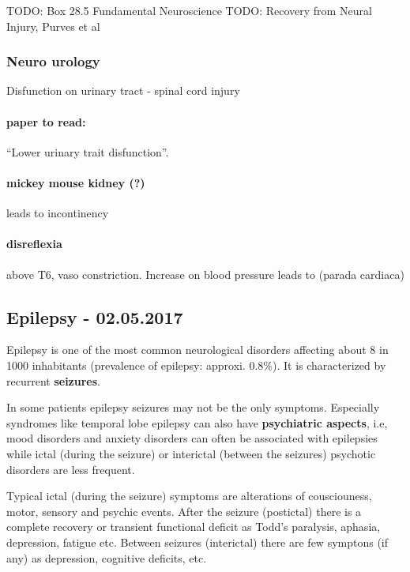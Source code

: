 \documentclass[12pt,article,oneside,a4paper]{memoir}
\begin{document}
TODO: Box 28.5 Fundamental Neuroscience
TODO: Recovery from Neural Injury, Purves et al
\subsubsection{Neuro urology}
Disfunction on urinary tract - spinal cord injury
\paragraph{paper to read:} ``Lower urinary trait disfunction''.

\paragraph{mickey mouse kidney (?)} leads to incontinency

\paragraph{disreflexia}  above T6, vaso constriction. Increase on blood pressure leads to (parada cardiaca)

\newpage
\subsection{Epilepsy - 02.05.2017}
Epilepsy is one of the most common neurological disorders affecting about 8 in 1000 inhabitants (prevalence of epilepsy: approxi. 0.8\%). It is characterized by recurrent \textbf{seizures}.

In some patients epilepsy seizures may not be the only symptoms. Especially syndromes like temporal lobe epilepsy can also have \textbf{psychiatric aspects}, i.e, mood disorders and anxiety disorders can often be associated with epilepsies while ictal (during the seizure) or interictal (between the seizures) psychotic disorders are less frequent.

Typical ictal (during the seizure) symptoms are alterations of cousciouness, motor, sensory and psychic events. After the seizure (postictal) there is a complete recovery or transient functional deficit as Todd's paralysis, aphasia, depression, fatigue etc. Between seizures (interictal) there are few symptons (if any) as depression, cognitive deficits, etc.
\end{document}
